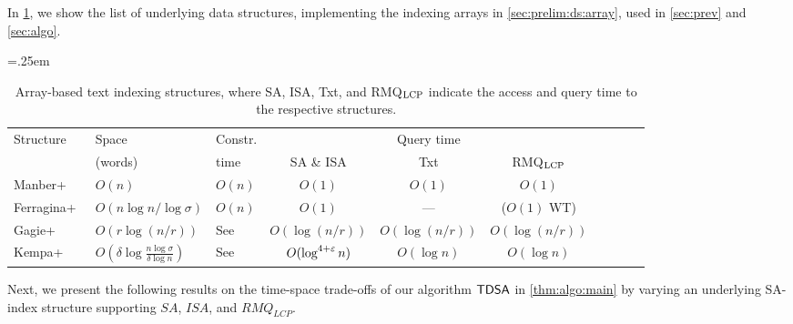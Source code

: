 \begin{toappendix}
In \cref{table:arrays:hybrid}, we show the list of underlying data structures, implementing the indexing arrays in \cref{sec:prelim:ds:array}, used in \cref{sec:prev} and \cref{sec:algo}. 
\begin{table}[h]\centering\tabcolsep=.25em
\caption{%
  Array-based text indexing structures, where SA, ISA, Txt, and RMQ$_{\mathrm{LCP}}$ indicate the access and query time to the respective structures.
}\label{table:arrays:hybrid}
\medskip
\begin{tabular}{l>{\centering}p{7em}>{\centering}p{4em}cccclll}\toprule
  Structure  & Space & Constr. & \multicolumn{3}{c}{Query time}	\\
\cmidrule{4-6}
& (words) & time  & SA \& ISA	& Txt	& RMQ$_{\mathrm{LCP}}$
\\
  \midrule
Manber+~\cite{manber:myers1993suffixarrays}	& $O(n)$   & $O(n)$	& $O(1)$	& $O(1)$	& $O(1)$	\\
Ferragina+~\cite{Ferragina05:FM}  & $O(n\log n/\log\sigma)$	& $O(n)$  & $O(1)$	& ---	& ($O(1)$ WT)	\\
Gagie+~\cite{gagie:navarro:prezza2020fully}	& $O(r\log(n/r))$	& See~\cite{gagie:navarro:prezza2020fully}   & $O(\log(n/r))$	& $O(\log(n/r))$	& $O(\log(n/r))$	\\
Kempa+~\cite{kempa:kociumaka2023collapsing}	& $O(\delta \log\frac{n\log\sigma}{\delta\log n})$	& See~\cite{kempa:kociumaka2023collapsing}   & $O(\log^{4+\varepsilon} n)$	& $O(\log n)$	& $O(\log n)$	\\
\bottomrule
\end{tabular}
\end{table}
\end{toappendix}

Next, we present the following results on the time-space trade-offs of our algorithm $\textsf{TDSA}$ in \cref{thm:algo:main} by varying an underlying SA-index structure supporting $SA$, $ISA$, and $RMQ_{LCP}$.


